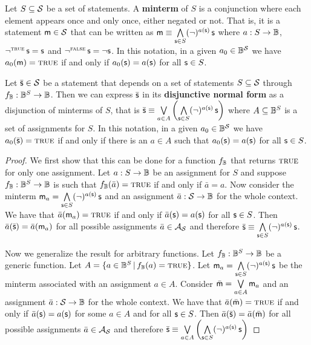 	\begin{mathSection}
		\begin{defn}\label{pm-vs-defMinterm}
			Let $S \subseteq \logCtx$ be a set of statements. A \textbf{minterm} of $S$ is a conjunction where each element appears once and only once, either negated or not. That is, it is a statement $\stmt[m] \in \logCtx$ that can be written as $\stmt[m] \equiv \bigAND \limits_{\stmt \in S} (\NOT)^{a(\stmt)} \, \stmt$ where $a : S \to \Bool$, $\NOT ^ \TRUE \, \stmt = \stmt$ and $\NOT ^ \FALSE \, \stmt = \NOT \stmt$. In this notation, in a given $a_0 \in \Bool^\logCtx$ we have $a_0(\stmt[m]) = \TRUE$ if and only if $a_0(\stmt) = a(\stmt)$ for all $\stmt \in S$.
		\end{defn}
		
		\begin{prop}\label{pm-vs-disjunctiveNormalForm}
			Let $\bar{\stmt} \in \logCtx$ be a statement that depends on a set of statements $S \subseteq \logCtx$ through $f_\Bool : \Bool^S \to \Bool$. Then we can express $\bar{\stmt}$ in its \textbf{disjunctive normal form} as a disjunction of minterms of $S$, that is $\bar{\stmt} \equiv \bigOR \limits_{a \in A} \left( \bigAND \limits_{\stmt \in S} (\NOT)^{a(\stmt)} \, \stmt \right)$ where $A \subseteq \Bool^S$ is a set of assignments for $S$. In this notation, in a given $a_0 \in \Bool^\logCtx$ we have $a_0(\bar{\stmt}) = \TRUE$ if and only if there is an $a \in A$ such that $a_0(\stmt) = a(\stmt)$ for all $\stmt \in S$.
		\end{prop}
		\begin{proof}
			We first show that this can be done for a function $f_\Bool$ that returns $\TRUE$ for only one assignment. Let $a : S \to \Bool$ be an assignment for $S$ and suppose $f_\Bool: \Bool^S \to \Bool$ is such that $f_\Bool(\bar{a}) = \TRUE$ if and only if $\bar{a} = a$. Now consider the minterm $\stmt[m]_a = \bigAND \limits_{\stmt \in S} (\NOT)^{a(\stmt)} \, \stmt$ and an assignment $\bar{a} : \logCtx \to \Bool$ for the whole context. We have that $\bar{a}(\stmt[m]_a) = \TRUE$ if and only if $\bar{a}(\stmt) = a(\stmt)$ for all $\stmt \in S$. Then $\bar{a}(\bar{\stmt}) = \bar{a}(\stmt[m]_a)$ for all possible assignments $\bar{a} \in \pAss$ and therefore $\bar{\stmt} \equiv \bigAND \limits_{\stmt \in S} (\NOT)^{a(\stmt)} \, \stmt$.
			
			Now we generalize the result for arbitrary functions. Let $f_\Bool : \Bool^S \to \Bool$ be a generic function. Let $A = \{ a \in \Bool^S \, | \, f_\Bool(a) = \TRUE \}$. Let $\stmt[m]_a = \bigAND \limits_{\stmt \in S} (\NOT)^{a(\stmt)} \, \stmt$ be the minterm associated with an assignment $a \in A$. Consider $\bar{\stmt[m]} = \bigOR \limits_{a \in A} \stmt[m]_a$ and an assignment $\bar{a} : \logCtx \to \Bool$ for the whole context. We have that $\bar{a}(\bar{\stmt[m]}) = \TRUE$ if and only if $\bar{a}(\stmt) = a(\stmt)$ for some $a \in A$ and for all $\stmt \in S$. Then $\bar{a}(\bar{\stmt}) = \bar{a}(\bar{\stmt[m]})$ for all possible assignments $\bar{a} \in \pAss$ and therefore $\bar{\stmt} \equiv \bigOR \limits_{a \in A} \left( \bigAND \limits_{\stmt \in S} (\NOT)^{a(\stmt)} \, \stmt \right)$
		\end{proof}
	\end{mathSection}
	
